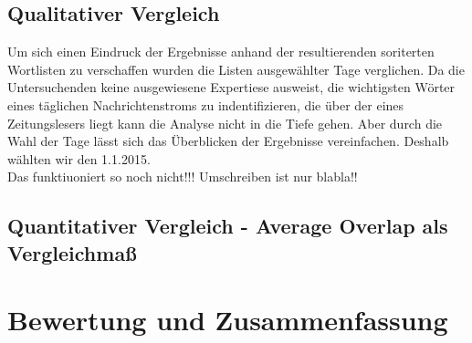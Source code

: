 \section{Qualitativer Vergleich}
Um sich einen Eindruck der Ergebnisse anhand der resultierenden soriterten Wortlisten zu verschaffen wurden die Listen ausgewählter Tage verglichen. Da die Untersuchenden keine ausgewiesene Expertiese ausweist, die wichtigsten Wörter eines täglichen Nachrichtenstroms zu indentifizieren, die über der eines Zeitungslesers liegt kann die Analyse nicht in die Tiefe gehen. Aber durch die Wahl der Tage lässt sich das Überblicken der Ergebnisse vereinfachen. Deshalb wählten wir den 1.1.2015. \\
 Das funktiuoniert so noch nicht!!! Umschreiben ist nur blabla!!
\section{Quantitativer Vergleich - Average Overlap als Vergleichmaß}\label{sec.quanitative_auswertung}




\chapter{Bewertung und Zusammenfassung}



\nocite{*}%
 

